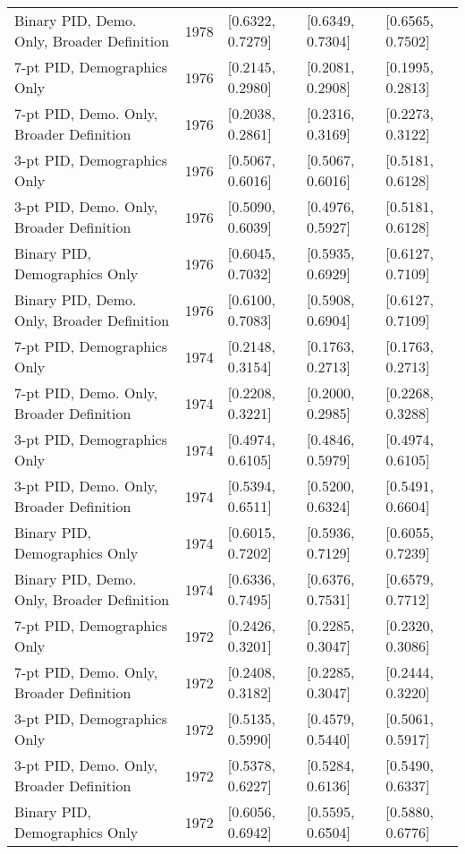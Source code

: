 \begin{longtable}{lrlll}
  Binary PID, Demo. Only, Broader Definition & 1978 & [0.6322, 0.7279] & [0.6349, 0.7304] & [0.6565, 0.7502] \\ 
  7-pt PID, Demographics Only & 1976 & [0.2145, 0.2980] & [0.2081, 0.2908] & [0.1995, 0.2813] \\ 
  7-pt PID, Demo. Only, Broader Definition & 1976 & [0.2038, 0.2861] & [0.2316, 0.3169] & [0.2273, 0.3122] \\ 
  3-pt PID, Demographics Only & 1976 & [0.5067, 0.6016] & [0.5067, 0.6016] & [0.5181, 0.6128] \\ 
  3-pt PID, Demo. Only, Broader Definition & 1976 & [0.5090, 0.6039] & [0.4976, 0.5927] & [0.5181, 0.6128] \\ 
  Binary PID, Demographics Only & 1976 & [0.6045, 0.7032] & [0.5935, 0.6929] & [0.6127, 0.7109] \\ 
  Binary PID, Demo. Only, Broader Definition & 1976 & [0.6100, 0.7083] & [0.5908, 0.6904] & [0.6127, 0.7109] \\ 
  7-pt PID, Demographics Only & 1974 & [0.2148, 0.3154] & [0.1763, 0.2713] & [0.1763, 0.2713] \\ 
  7-pt PID, Demo. Only, Broader Definition & 1974 & [0.2208, 0.3221] & [0.2000, 0.2985] & [0.2268, 0.3288] \\ 
  3-pt PID, Demographics Only & 1974 & [0.4974, 0.6105] & [0.4846, 0.5979] & [0.4974, 0.6105] \\ 
  3-pt PID, Demo. Only, Broader Definition & 1974 & [0.5394, 0.6511] & [0.5200, 0.6324] & [0.5491, 0.6604] \\ 
  Binary PID, Demographics Only & 1974 & [0.6015, 0.7202] & [0.5936, 0.7129] & [0.6055, 0.7239] \\ 
  Binary PID, Demo. Only, Broader Definition & 1974 & [0.6336, 0.7495] & [0.6376, 0.7531] & [0.6579, 0.7712] \\ 
  7-pt PID, Demographics Only & 1972 & [0.2426, 0.3201] & [0.2285, 0.3047] & [0.2320, 0.3086] \\ 
  7-pt PID, Demo. Only, Broader Definition & 1972 & [0.2408, 0.3182] & [0.2285, 0.3047] & [0.2444, 0.3220] \\ 
  3-pt PID, Demographics Only & 1972 & [0.5135, 0.5990] & [0.4579, 0.5440] & [0.5061, 0.5917] \\ 
  3-pt PID, Demo. Only, Broader Definition & 1972 & [0.5378, 0.6227] & [0.5284, 0.6136] & [0.5490, 0.6337] \\ 
  Binary PID, Demographics Only & 1972 & [0.6056, 0.6942] & [0.5595, 0.6504] & [0.5880, 0.6776] \\ 

\end{longtable}

